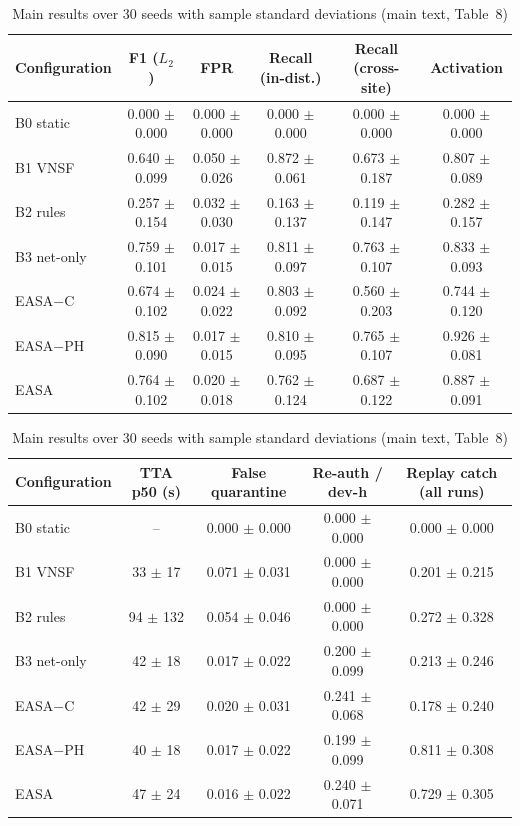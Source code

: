 \begin{table}[!htb]
\caption{Main results over 30 seeds with sample standard deviations (main text, Table~8)}
\label{tab:results-full}
\centering\footnotesize
\setlength{\tabcolsep}{4pt}
\begin{tabular}{lccccc}
\toprule
Configuration & F1 ($L_2$) & FPR & Recall (in-dist.) & Recall (cross-site) & Activation \\
\midrule
B0 static & 0.000 $\pm$ 0.000 & 0.000 $\pm$ 0.000 & 0.000 $\pm$ 0.000 & 0.000 $\pm$ 0.000 & 0.000 $\pm$ 0.000 \\
B1 VNSF & 0.640 $\pm$ 0.099 & 0.050 $\pm$ 0.026 & 0.872 $\pm$ 0.061 & 0.673 $\pm$ 0.187 & 0.807 $\pm$ 0.089 \\
B2 rules & 0.257 $\pm$ 0.154 & 0.032 $\pm$ 0.030 & 0.163 $\pm$ 0.137 & 0.119 $\pm$ 0.147 & 0.282 $\pm$ 0.157 \\
B3 net-only & 0.759 $\pm$ 0.101 & 0.017 $\pm$ 0.015 & 0.811 $\pm$ 0.097 & 0.763 $\pm$ 0.107 & 0.833 $\pm$ 0.093 \\
EASA$-$C & 0.674 $\pm$ 0.102 & 0.024 $\pm$ 0.022 & 0.803 $\pm$ 0.092 & 0.560 $\pm$ 0.203 & 0.744 $\pm$ 0.120 \\
EASA$-$PH & 0.815 $\pm$ 0.090 & 0.017 $\pm$ 0.015 & 0.810 $\pm$ 0.095 & 0.765 $\pm$ 0.107 & 0.926 $\pm$ 0.081 \\
EASA & 0.764 $\pm$ 0.102 & 0.020 $\pm$ 0.018 & 0.762 $\pm$ 0.124 & 0.687 $\pm$ 0.122 & 0.887 $\pm$ 0.091 \\
\bottomrule
\end{tabular}
\par\vspace{6pt}
\begin{tabular}{lcccc}
\toprule
Configuration & TTA p50 (s) & False quarantine & Re-auth / dev-h & Replay catch (all runs) \\
\midrule
B0 static & -- & 0.000 $\pm$ 0.000 & 0.000 $\pm$ 0.000 & 0.000 $\pm$ 0.000 \\
B1 VNSF & 33 $\pm$ 17 & 0.071 $\pm$ 0.031 & 0.000 $\pm$ 0.000 & 0.201 $\pm$ 0.215 \\
B2 rules & 94 $\pm$ 132 & 0.054 $\pm$ 0.046 & 0.000 $\pm$ 0.000 & 0.272 $\pm$ 0.328 \\
B3 net-only & 42 $\pm$ 18 & 0.017 $\pm$ 0.022 & 0.200 $\pm$ 0.099 & 0.213 $\pm$ 0.246 \\
EASA$-$C & 42 $\pm$ 29 & 0.020 $\pm$ 0.031 & 0.241 $\pm$ 0.068 & 0.178 $\pm$ 0.240 \\
EASA$-$PH & 40 $\pm$ 18 & 0.017 $\pm$ 0.022 & 0.199 $\pm$ 0.099 & 0.811 $\pm$ 0.308 \\
EASA & 47 $\pm$ 24 & 0.016 $\pm$ 0.022 & 0.240 $\pm$ 0.071 & 0.729 $\pm$ 0.305 \\
\bottomrule
\end{tabular}
\end{table}
